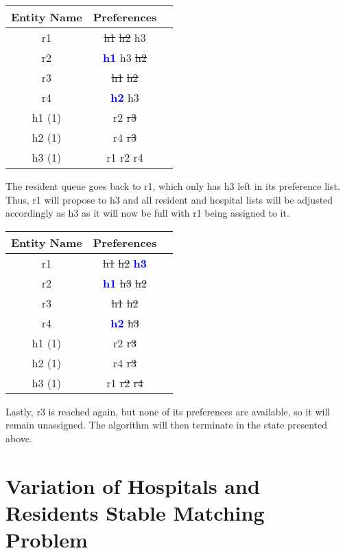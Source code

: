 \documentclass[letterpaper, 10pt,DIV=13]{scrartcl}
\numberwithin{equation}{section} %
\numberwithin{figure}{section} %
\numberwithin{table}{section} %
\begin{document}
\begin{center}
  \begin{tabular}{|c|c|c|}
    \hline
    Entity Name & Preferences \\
    \hline
    r1 & \st{h1} \st{h2} h3 \\
    \hline
    r2 & \textcolor{blue}{\textbf{h1}} h3 \st{h2} \\
    \hline
    r3 & \st{h1} \st{h2} \\
    \hline
    r4 & \textcolor{blue}{\textbf{h2}} h3 \\
    \hline
    \hline
    h1 (1) & r2 \st{r3} \\
    \hline
    h2 (1) & r4 \st{r3} \\
    \hline
    h3 (1) & r1 r2 r4 \\
    \hline
  \end{tabular}
\end{center}

The resident queue goes back to r1, which only has h3 left in its preference list. Thus, r1 will propose to h3 and all resident and hospital lists will be adjusted accordingly as h3 as it will now be full with r1 being assigned to it.

\begin{center}
  \begin{tabular}{|c|c|c|}
    \hline
    Entity Name & Preferences \\
    \hline
    r1 & \st{h1} \st{h2} \textcolor{blue}{\textbf{h3}} \\
    \hline
    r2 & \textcolor{blue}{\textbf{h1}} \st{h3} \st{h2} \\
    \hline
    r3 & \st{h1} \st{h2} \\
    \hline
    r4 & \textcolor{blue}{\textbf{h2}} \st{h3} \\
    \hline
    \hline
    h1 (1) & r2 \st{r3} \\
    \hline
    h2 (1) & r4 \st{r3} \\
    \hline
    h3 (1) & r1 \st{r2} \st{r4} \\
    \hline
  \end{tabular}
\end{center}

Lastly, r3 is reached again, but none of its preferences are available, so it will remain unassigned. The algorithm will then terminate in the state presented above.

\section{Variation of Hospitals and Residents Stable Matching Problem}
\end{document}

